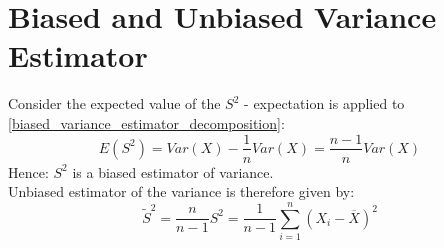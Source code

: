 \documentclass[12pt]{article}
\begin{document}
\section{Biased and Unbiased Variance Estimator}
Consider the expected value of the $S^2$ - expectation is applied to 
\ref{biased_variance_estimator_decomposition}:
\begin{equation*}
E(S^2) = Var(X) - \frac{1}{n} Var(X) = \frac{n-1}{n} Var(X)
\end{equation*}
Hence: $S^2$ is a biased estimator of variance.\\
Unbiased estimator of the variance is therefore given by:
\begin{equation*}
\tilde{S}^2 = \frac{n}{n-1} S^2 = 
\frac{1}{n-1} \sum_{i=1}^{n} (X_i - \overline{X})^2
\end{equation*}





\end{document}
